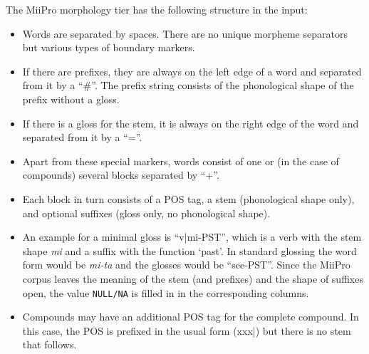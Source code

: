 \documentclass[a4paper, 11pt]{book}
\newcommand{\und}{\underline{{ }}\hspace{0.2mm}}	%
\begin{document}

The MiiPro morphology tier has the following structure in the input:

\begin{itemize}
	\item Words are separated by spaces. There are no unique morpheme separators but various types of boundary markers. 
	\item If there are prefixes, they are always on the left edge of a word and separated from it by a “\#”. The prefix string consists of the phonological shape
		of the prefix without a gloss. 
	\item If there is a gloss for the stem, it is always on the right edge of the word and separated from it by a “=”.
	\item Apart from these special markers, words consist of one or (in the case of compounds) several blocks separated by “+”. 
	\item Each block in turn consists of a POS tag, a stem (phonological shape only), and optional suffixes (gloss only, no phonological shape). 
	\item An example for a minimal gloss is “v|mi-PST”, which is a verb with the stem shape \emph{mi} and a suffix with 
		the function ‘past’. In standard glossing the word form would be \emph{mi-ta} and the glosses would be “see-PST”. 
		Since the MiiPro corpus leaves the meaning of the stem (and prefixes) and the shape of suffixes open, the value \texttt{NULL/NA} is filled 
		in in the corresponding columns. 
	\item Compounds may have an additional POS tag for the complete compound. In this case, the POS is prefixed in the usual form (xxx|) but there is no stem that follows.
\end{itemize}
\end{document}
